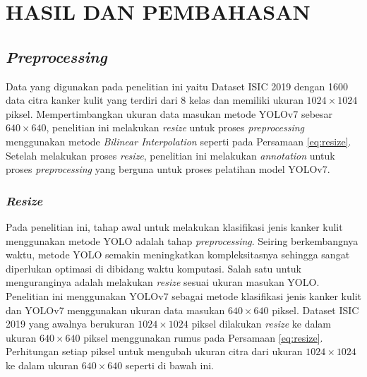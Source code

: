\chapter{HASIL DAN PEMBAHASAN}

\section{\textit{Preprocessing}}
Data yang digunakan pada penelitian ini yaitu Dataset ISIC 2019 dengan 1600 data citra kanker kulit yang terdiri dari 8 kelas dan memiliki ukuran $1024\times 1024$ piksel. Mempertimbangkan ukuran data masukan metode YOLOv7 sebesar $640\times 640$, penelitian ini melakukan \textit{resize} untuk proses \textit{preprocessing} menggunakan metode \textit{Bilinear Interpolation} seperti pada Persamaan \ref{eq:resize}. Setelah melakukan proses \textit{resize}, penelitian ini melakukan \textit{annotation} untuk proses \textit{preprocessing} yang berguna untuk proses pelatihan model YOLOv7.
    \subsection{\textit{Resize}}
    Pada penelitian ini, tahap awal untuk melakukan klasifikasi jenis kanker kulit menggunakan metode YOLO adalah tahap \textit{preprocessing}. Seiring berkembangnya waktu, metode YOLO semakin meningkatkan kompleksitasnya sehingga sangat diperlukan optimasi di dibidang waktu komputasi. Salah satu untuk menguranginya adalah melakukan \textit{resize} sesuai ukuran masukan YOLO. Penelitian ini menggunakan YOLOv7 sebagai metode klasifikasi jenis kanker kulit dan YOLOv7 menggunakan ukuran data masukan $640\times 640$ piksel. Dataset ISIC 2019 yang awalnya berukuran $1024\times 1024$ piksel dilakukan \textit{resize} ke dalam ukuran $640\times 640$ piksel menggunakan rumus pada Persamaan \ref{eq:resize}. Perhitungan setiap piksel untuk mengubah ukuran citra dari ukuran $1024\times 1024$ ke dalam ukuran $640\times 640$ seperti di bawah ini.

